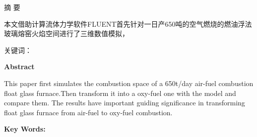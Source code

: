 \newpage
\thispagestyle{empty}
\begin{center}
    \heiti {} 摘 \quad 要
\end{center}

\songti {}
本文借助计算流体力学软件FLUENT首先针对一日产650吨的空气燃烧的燃油浮法玻璃熔窑火焰空间进行了三维数值模拟，

{\heiti {} 关键词：}\songti {} 

\newpage
\thispagestyle{empty}
\begin{center}
    \bfseries {} Abstract
\end{center}

This paper first simulates the combustion space of a 650t/day air-fuel combustion float glass furnace.Then transform it into a oxy-fuel one with the model and compare them. The results have important guiding significance in transforming float glass furnace
 from air-fuel to oxy-fuel combustion. 

{\bfseries {} Key Words:}   